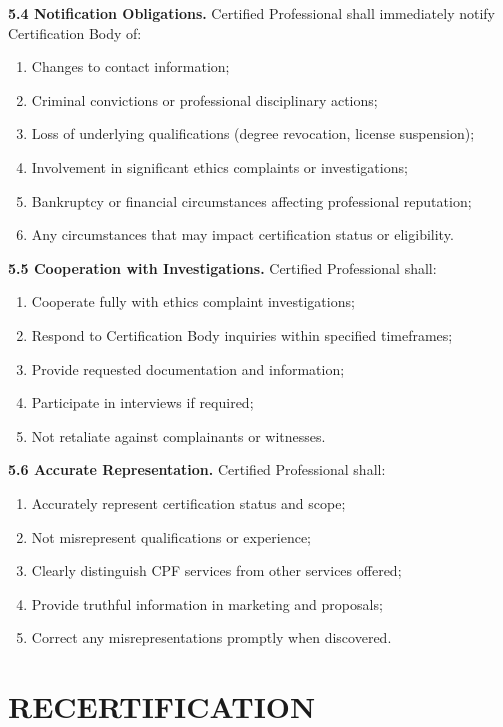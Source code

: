 \documentclass[11pt,a4paper]{article}
\begin{document}
\textbf{5.4 Notification Obligations.} Certified Professional shall immediately notify Certification Body of:

\begin{enumerate}[label=\alph*)]
\item Changes to contact information;
\item Criminal convictions or professional disciplinary actions;
\item Loss of underlying qualifications (degree revocation, license suspension);
\item Involvement in significant ethics complaints or investigations;
\item Bankruptcy or financial circumstances affecting professional reputation;
\item Any circumstances that may impact certification status or eligibility.
\end{enumerate}

\textbf{5.5 Cooperation with Investigations.} Certified Professional shall:

\begin{enumerate}[label=\alph*)]
\item Cooperate fully with ethics complaint investigations;
\item Respond to Certification Body inquiries within specified timeframes;
\item Provide requested documentation and information;
\item Participate in interviews if required;
\item Not retaliate against complainants or witnesses.
\end{enumerate}

\textbf{5.6 Accurate Representation.} Certified Professional shall:

\begin{enumerate}[label=\alph*)]
\item Accurately represent certification status and scope;
\item Not misrepresent qualifications or experience;
\item Clearly distinguish CPF services from other services offered;
\item Provide truthful information in marketing and proposals;
\item Correct any misrepresentations promptly when discovered.
\end{enumerate}

\section{RECERTIFICATION}
\end{document}
